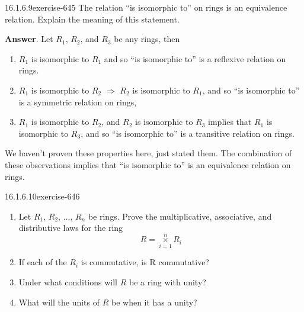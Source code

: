 \documentclass[twoside,10pt,]{book}
\numberwithin{equation}{section}
\begin{document}
\begin{divisionsolution}{16.1.6.9}{}{exercise-645}%
\hypertarget{p-5823}{}%
The relation ``is isomorphic to'' on rings is an equivalence relation. Explain the meaning of this statement.%
\par\smallskip%
\noindent\textbf{Answer}.\quad%
\hypertarget{p-5824}{}%
Let \(R_1\), \(R_2\), and \(R_3\)  be any rings, then\leavevmode%
\begin{enumerate}[label=(\alph*)]
\item\hypertarget{li-2572}{}\hypertarget{p-5825}{}%
\(R_1\) is isomorphic to \(R_1\) and so ``is isomorphic to'' is a reflexive relation on rings.%
\item\hypertarget{li-2573}{}\hypertarget{p-5826}{}%
\(R_1\) is isomorphic to \(R_2\)  \(\Rightarrow\) \(R_2\) is isomorphic to \(R_1\), and so ``is isomorphic to'' is a symmetric relation on rings,%
\item\hypertarget{li-2574}{}\hypertarget{p-5827}{}%
\(R_1\) is isomorphic to \(R_2\), and \(R_2\) is isomorphic to \(R_3\) implies that \(R_1\) is isomorphic to \(R_3\), and so ``is isomorphic to'' is a transitive relation on rings.%
\end{enumerate}
We haven't proven these properties here, just stated them.  The combination of these observations implies that ``is isomorphic to'' is an equivalence relation on rings.%
\end{divisionsolution}%
\begin{divisionsolution}{16.1.6.10}{}{exercise-646}%
\hypertarget{p-5828}{}%
\leavevmode%
\begin{enumerate}[label=(\alph*)]
\item\hypertarget{li-2575}{}\hypertarget{p-5829}{}%
Let \(R_1\), \(R_2\), \(\ldots\), \(R_n\) be rings. Prove the multiplicative, associative, and distributive laws for the ring%
\begin{equation*}
R=\underset{i=1}{\overset{n}{\times }}R_i
\end{equation*}
%
\item\hypertarget{li-2576}{}\hypertarget{p-5830}{}%
If each of the \(R_i\) is commutative, is R commutative?%
\item\hypertarget{li-2577}{}\hypertarget{p-5831}{}%
Under what conditions will \(R\) be a ring with unity?%
\item\hypertarget{li-2578}{}\hypertarget{p-5832}{}%
What will the units of \(R\) be when it has a unity?%
\end{enumerate}
%
\end{divisionsolution}%
\end{document}
